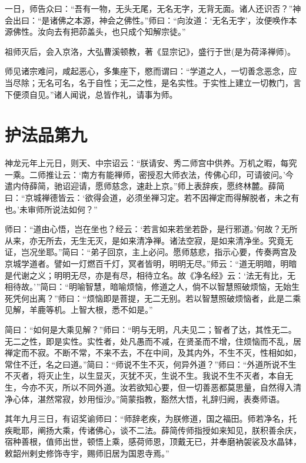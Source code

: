 \documentclass[UTF8, 11pt, oneside]{ctexart}
\begin{document}
一日，师告众曰：“吾有一物，无头无尾，无名无字，无背无面。诸人还识否？”神会出曰：“是诸佛之本源，神会之佛性。”师曰：“向汝道：‘无名无字’，汝便唤作本源佛性。汝向去有把茆盖头，也只成个知解宗徒。”

祖师灭后，会入京洛，大弘曹溪顿教，著《显宗记》，盛行于世(是为荷泽禅师)。

师见诸宗难问，咸起恶心，多集座下，愍而谓曰：“学道之人，一切善念恶念，应当尽除；无名可名，名于自性；无二之性，是名实性。于实性上建立一切教门，言下便须自见。”诸人闻说，总皆作礼，请事为师。



\section*{护法品第九}

神龙元年上元日，则天、中宗诏云：“朕请安、秀二师宫中供养。万机之暇，每究一乘。二师推让云：‘南方有能禅师，密授忍大师衣法，传佛心印，可请彼问。’今遣内侍薛简，驰诏迎请，愿师慈念，速赴上京。”师上表辞疾，愿终林麓。薛简曰：“京城禅德皆云：‘欲得会道，必须坐禅习定。若不因禅定而得解脱者，未之有也。’未审师所说法如何？”

师曰：“道由心悟，岂在坐也？经云：‘若言如来若坐若卧，是行邪道。’何故？无所从来，亦无所去，无生无灭，是如来清净禅。诸法空寂，是如来清净坐。究竟无证，岂况坐耶。”简曰：“弟子回京，主上必问。愿师慈悲，指示心要，传奏两宫及京城学道者。譬如一灯燃百千灯，冥者皆明，明明无尽。”师云：“道无明暗，明暗是代谢之义；明明无尽，亦是有尽，相待立名。故《净名经》云：‘法无有比，无相待故。’”简曰：“明喻智慧，暗喻烦恼，修道之人，倘不以智慧照破烦恼，无始生死凭何出离？”师曰：“烦恼即是菩提，无二无别。若以智慧照破烦恼者，此是二乘见解，羊鹿等机。上智大根，悉不如是。”

简曰：“如何是大乘见解？”师曰：“明与无明，凡夫见二；智者了达，其性无二。无二之性，即是实性。实性者，处凡愚而不减，在贤圣而不增，住烦恼而不乱，居禅定而不寂。不断不常，不来不去，不在中间，及其内外，不生不灭，性相如如，常住不迁，名之曰道。”简曰：“师说不生不灭，何异外道？”师曰：“外道所说不生不灭者，将灭止生，以生显灭，灭犹不灭，生说不生。我说不生不灭者，本自无生，今亦不灭，所以不同外道。汝若欲知心要，但一切善恶都莫思量，自然得入清净心体，湛然常寂，妙用恒沙。”简蒙指教，豁然大悟，礼辞归阙，表奏师语。

其年九月三日，有诏奖谕师曰：“师辞老疾，为朕修道，国之福田。师若净名，托疾毗耶，阐扬大乘，传诸佛心，谈不二法。薛简传师指授如来知见，朕积善余庆，宿种善根，值师出世，顿悟上乘，感荷师恩，顶戴无已，并奉磨衲袈裟及水晶钵，敕韶州剌史修饰寺宇，赐师旧居为国恩寺焉。”
\end{document}
